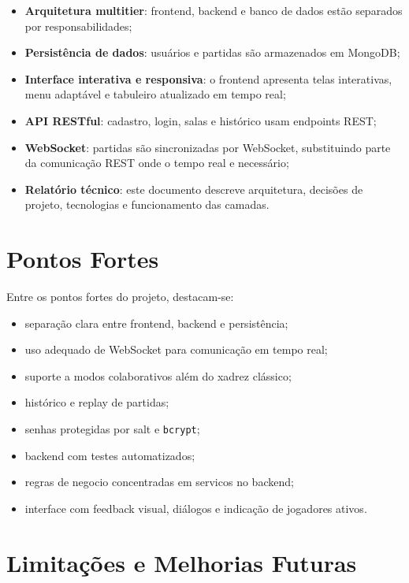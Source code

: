 \documentclass[12pt]{article}
\begin{document}
\begin{itemize}
    \item \textbf{Arquitetura multitier}: frontend, backend e banco de dados estão separados por responsabilidades;
    \item \textbf{Persistência de dados}: usuários e partidas são armazenados em MongoDB;
    \item \textbf{Interface interativa e responsiva}: o frontend apresenta telas interativas, menu adaptável e tabuleiro atualizado em tempo real;
    \item \textbf{API RESTful}: cadastro, login, salas e histórico usam endpoints REST;
    \item \textbf{WebSocket}: partidas são sincronizadas por WebSocket, substituindo parte da comunicação REST onde o tempo real e necessário;
    \item \textbf{Relatório técnico}: este documento descreve arquitetura, decisões de projeto, tecnologias e funcionamento das camadas.
\end{itemize}

\section{Pontos Fortes}

Entre os pontos fortes do projeto, destacam-se:

\begin{itemize}
    \item separação clara entre frontend, backend e persistência;
    \item uso adequado de WebSocket para comunicação em tempo real;
    \item suporte a modos colaborativos além do xadrez clássico;
    \item histórico e replay de partidas;
    \item senhas protegidas por salt e \texttt{bcrypt};
    \item backend com testes automatizados;
    \item regras de negocio concentradas em servicos no backend;
    \item interface com feedback visual, diálogos e indicação de jogadores ativos.
\end{itemize}

\section{Limitações e Melhorias Futuras}
\end{document}
